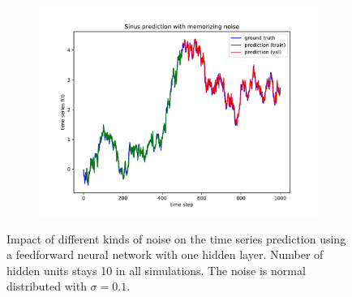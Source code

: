\documentclass{article}
\begin{document}
\begin{figure}
\begin{subfigure}{.35\textwidth}
    \includegraphics[width=\linewidth]{figures/plot_twolayer_memnoise.pdf}
  \end{subfigure}
  \caption{Impact of different kinds of noise on the time series prediction
    using a feedforward neural network with one hidden layer. Number of hidden
    units stays 10 in all simulations. The noise is normal distributed with $\sigma =
      0.1$.}
  \label{fig:noise_impact}
\end{figure}
\end{document}
